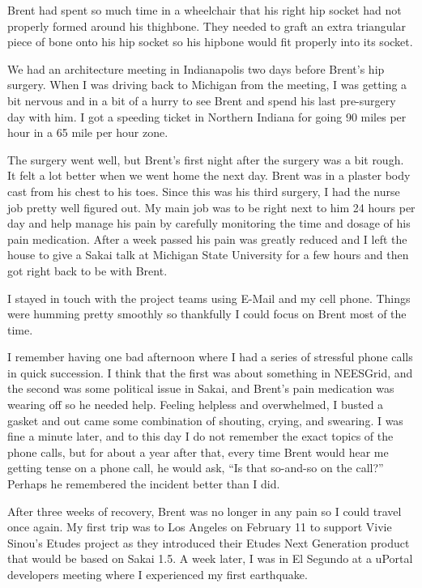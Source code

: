 \documentclass[12pt]{book}
\begin{document}
Brent had spent so much time in a wheelchair
that his right hip socket had not properly formed around
his thighbone.  They needed to graft an extra triangular
piece of bone onto his hip socket so his hipbone would
fit properly into its socket.

We had an architecture meeting in Indianapolis two days
before Brent's hip surgery.  When I was
driving back to Michigan from the meeting,
I was getting a bit nervous and
in a bit of a hurry to see Brent and spend his last
pre-surgery day with him.  I got a speeding ticket in
Northern Indiana for going 90 miles per hour in a 65
mile per hour zone.

The surgery went well, but Brent's first night after the
surgery was a bit rough.  It felt a lot better when we went
home the next day.  Brent was in a plaster body cast from his
chest to his toes.  Since this was his third surgery,
I had the nurse job pretty well figured out.  My main job
was to be right next to him 24 hours per day and help manage
his pain by carefully monitoring the time and dosage
of his pain medication.
After a week passed his pain was greatly reduced and I
left the house to give a Sakai talk at Michigan State
University for a few hours and then got right back
to be with Brent.

I stayed in touch with the project teams using E-Mail and
my cell phone.  Things were humming pretty smoothly
so thankfully I could focus on Brent most of the time.

I remember having one bad afternoon where I had a series
of stressful phone calls in quick succession.
I think that the first was about something in NEESGrid,
and the second was some political issue in Sakai,
and Brent's pain medication was wearing off so he needed
help.  Feeling helpless and overwhelmed, I busted a gasket
and out came some combination of shouting, crying,
and swearing.  I was fine a minute later,
and to this day I do not remember the exact topics
of the phone calls, but for about a year after
that, every time Brent would hear me getting tense on
a phone call, he would ask, ``Is that so-and-so
on the call?''  Perhaps he remembered the incident
better than I did.

After three weeks of recovery, Brent was no longer in any pain
so I could travel once again.  My first trip was to Los Angeles
on February 11 to support Vivie Sinou's Etudes project as
they introduced their Etudes Next Generation product
that would be based on Sakai 1.5.   A week later, I
was in El Segundo at a uPortal developers meeting
where I experienced my first earthquake.
\end{document}

